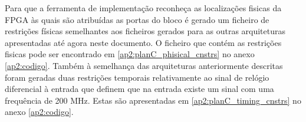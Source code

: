 

Para que a ferramenta de implementação reconheça as localizações fisicas da FPGA às quais são atribuídas as portas do bloco é gerado um ficheiro de restrições físicas semelhantes aos ficheiros gerados para as outras arquiteturas apresentadas até agora neste documento. O ficheiro que contém as restrições fisicas pode ser encontrado em \ref{ap2:planC_phisical_cnstrs} no anexo \ref{ap2:codigo}. Também à semelhança das arquiteturas anteriormente descritas foram geradas duas restrições temporais relativamente ao sinal de relógio diferencial à entrada que definem que na entrada existe um sinal com uma frequência de 200 MHz. Estas são apresentadas em \ref{ap2:planC_timing_cnstrs} no anexo \ref{ap2:codigo}.

